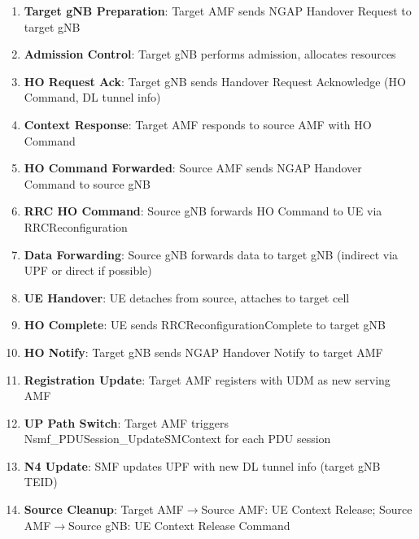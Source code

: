 \begin{enumerate}
  \begin{itemize}
  \tightlist
  \item
    UE context (SUPI, security context, PDU session list)
  \item
    Source-to-Target container
  \item
    MM context, SM contexts
  \end{itemize}
\item
  \textbf{Target gNB Preparation}: Target AMF sends NGAP Handover Request to target gNB
\item
  \textbf{Admission Control}: Target gNB performs admission, allocates resources
\item
  \textbf{HO Request Ack}: Target gNB sends Handover Request Acknowledge (HO Command, DL tunnel info)
\item
  \textbf{Context Response}: Target AMF responds to source AMF with HO Command
\item
  \textbf{HO Command Forwarded}: Source AMF sends NGAP Handover Command to source gNB
\item
  \textbf{RRC HO Command}: Source gNB forwards HO Command to UE via RRCReconfiguration
\item
  \textbf{Data Forwarding}: Source gNB forwards data to target gNB (indirect via UPF or direct if possible)
\item
  \textbf{UE Handover}: UE detaches from source, attaches to target cell
\item
  \textbf{HO Complete}: UE sends RRCReconfigurationComplete to target gNB
\item
  \textbf{HO Notify}: Target gNB sends NGAP Handover Notify to target AMF
\item
  \textbf{Registration Update}: Target AMF registers with UDM as new serving AMF
\item
  \textbf{UP Path Switch}: Target AMF triggers Nsmf\_\allowbreak{}PDUSession\_\allowbreak{}UpdateSMContext for each PDU session
\item
  \textbf{N4 Update}: SMF updates UPF with new DL tunnel info (target gNB TEID)
\item
  \textbf{Source Cleanup}: Target AMF\ensuremath{\to}Source AMF: UE Context Release; Source AMF\ensuremath{\to}Source gNB: UE Context Release Command
\end{enumerate}




